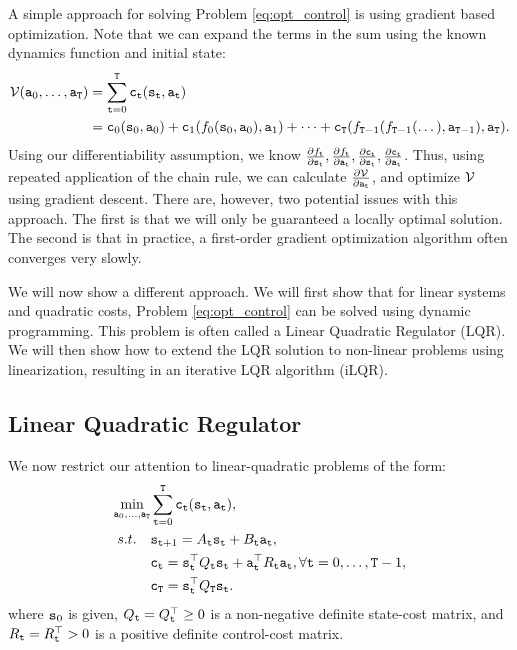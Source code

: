 A simple approach for solving Problem \ref{eq:opt_control} is using gradient based optimization. Note that we can expand the terms in the sum using the known dynamics function and initial state:
\begin{equation*}
\begin{split}
        \mathcal{V}({\tt a}_0,\dots,{\tt a}_{\tt T}) &= \sum_{{\tt t}=0}^{\tt T} {\tt c}_{\tt t}({\tt s}_{\tt t}, {\tt a}_{\tt t}) \\
        & = {\tt c}_0({\tt s}_0, {\tt a}_0) + {\tt c}_1(f_0({\tt s}_0,{\tt a}_0), {\tt a}_1) + \dots + {\tt c}_{\tt T}(f_{{\tt T} - 1}(f_{{\tt T} - 1}(\dots ),{\tt a}_{{\tt T}-1}), {\tt a}_{\tt T}).
\end{split}
\end{equation*}
Using our differentiability assumption, we know $\frac{\partial f_{\tt t}}{\partial {\tt s}_{\tt t}}, \frac{\partial f_{\tt t}}{\partial {\tt a}_{\tt t}}, \frac{\partial {\tt c}_{\tt t}}{\partial {\tt s}_{\tt t}}, \frac{\partial {\tt c}_{\tt t}}{\partial {\tt a}_{\tt t}}$. Thus, using repeated application of the chain rule, we can calculate $\frac{\partial \mathcal{V}}{\partial {\tt a}_{\tt t}}$, and optimize $\mathcal{V}$ using gradient descent. There are, however, two potential issues with this approach. The first is that we will only be guaranteed a locally optimal solution. The second is that in practice, a first-order gradient optimization algorithm often converges very slowly.

We will now show a different approach. We will first show that for linear systems and quadratic costs, Problem \ref{eq:opt_control} can be solved using dynamic programming. This problem is often called a Linear Quadratic Regulator (LQR). We will then show how to extend the LQR solution to non-linear problems using linearization, resulting in an iterative LQR algorithm (iLQR).

\subsection{Linear Quadratic Regulator}

We now restrict our attention to linear-quadratic problems of the form:
\begin{equation}\label{eq:lqr}
    \begin{split}
        \min_{{\tt a}_0,\dots,{\tt a}_{{\tt T}}} & \sum_{{\tt t}=0}^{\tt T} {\tt c}_{\tt t}({\tt s}_{\tt t}, {\tt a}_{\tt t}), \\
        s.t. \quad & {{\tt s}_{{\tt t}+1}} = A_{\tt t} {\tt s}_{\tt t} + B_{\tt t} {\tt a}_{\tt t}, \\
        & {\tt c}_{\tt t} = {\tt s}_{\tt t}^\top Q_{\tt t} {\tt s}_{\tt t} + {\tt a}_{\tt t}^\top R_{\tt t} {\tt a}_{\tt t}, \forall {\tt t}=0,\dots,{\tt T}-1, \\
        & {\tt c}_{\tt T} = {\tt s}_{\tt t}^\top Q_{\tt T} {\tt s}_{\tt t}.
    \end{split}
\end{equation}
where ${\tt s}_0$ is given, $Q_{\tt t}=Q_{\tt t}^\top \geq 0$ is a non-negative definite state-cost matrix, and $R_{\tt t} = R_{\tt t}^\top > 0 $ is a positive definite control-cost matrix.

